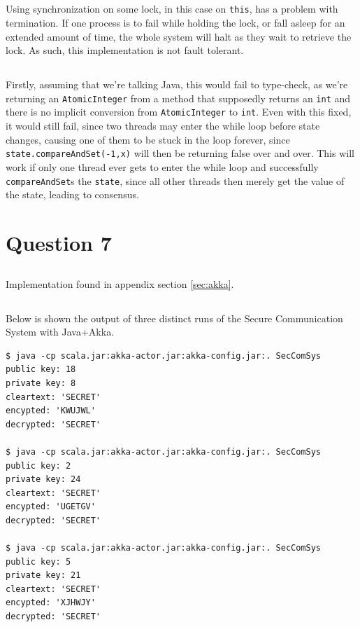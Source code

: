 \documentclass[a5paper]{article}
\begin{document}
\subsection{}
Using synchronization on some lock, in this case on \texttt{this}, has a problem with termination. If one process is to fail while holding the lock, or fall asleep for an extended amount of time,
the whole system will halt as they wait to retrieve the lock. As such, this implementation is not fault tolerant.

\subsection{}
Firstly, assuming that we're talking Java, this would fail to type-check, as we're returning an \texttt{AtomicInteger} from a method that supposedly returns an \texttt{int} and there is no implicit conversion from \texttt{AtomicInteger} to \texttt{int}. Even with this fixed, it would still fail, since two threads may enter the while loop before state changes, causing one of them to be stuck in the loop forever, since \texttt{state.compareAndSet(-1,x)} will then be returning false over and over. This will work if only one thread ever gets to enter the while loop and successfully \texttt{compareAndSet}s the \texttt{state}, since all other threads then merely get the value of the state, leading to consensus.

\section{Question 7}
\subsection{}
Implementation found in appendix section \ref{sec:akka}.

\subsection{}
Below is shown the output of three distinct runs of the Secure Communication System with Java+Akka.
\begin{verbatim}
$ java -cp scala.jar:akka-actor.jar:akka-config.jar:. SecComSys
public key: 18
private key: 8
cleartext: 'SECRET'
encypted: 'KWUJWL'
decrypted: 'SECRET'

$ java -cp scala.jar:akka-actor.jar:akka-config.jar:. SecComSys
public key: 2
private key: 24
cleartext: 'SECRET'
encypted: 'UGETGV'
decrypted: 'SECRET'

$ java -cp scala.jar:akka-actor.jar:akka-config.jar:. SecComSys
public key: 5
private key: 21
cleartext: 'SECRET'
encypted: 'XJHWJY'
decrypted: 'SECRET'
\end{verbatim}
\end{document}
